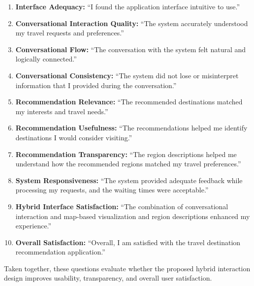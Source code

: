 \begin{enumerate}
  \item \textbf{Interface Adequacy:} ``I found the application interface intuitive to use.''
  \item \textbf{Conversational Interaction Quality:} ``The system accurately understood my travel requests and preferences.''
  \item \textbf{Conversational Flow:} ``The conversation with the system felt natural and logically connected.''
  \item \textbf{Conversational Consistency:} ``The system did not lose or misinterpret information that I provided during the conversation.''
  \item \textbf{Recommendation Relevance:} ``The recommended destinations matched my interests and travel needs.''
  \item \textbf{Recommendation Usefulness:} ``The recommendations helped me identify destinations I would consider visiting.''
  \item \textbf{Recommendation Transparency:} ``The region descriptions helped me understand how the recommended regions matched my travel preferences.''
  \item \textbf{System Responsiveness:} ``The system provided adequate feedback while processing my requests, and the waiting times were acceptable.''
  \item \textbf{Hybrid Interface Satisfaction:} ``The combination of conversational interaction and map-based visualization and region descriptions enhanced my experience.''
  \item \textbf{Overall Satisfaction:} ``Overall, I am satisfied with the travel destination recommendation application.''
\end{enumerate}

Taken together, these questions evaluate whether the proposed hybrid interaction design improves usability, transparency, and overall user satisfaction.

